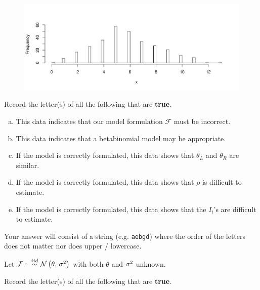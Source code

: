 \documentclass[12pt]{article}
\newcommand{\instr}{\scriptsize Your answer will consist of a string (e.g. \texttt{aebgd}) where the order of the letters does not matter nor does upper / lowercase. \normalsize}
\newcommand{\recordletters}{\small Record the letter(s) of all the following that are \textbf{true}. \normalsize}
\begin{document}
\begin{figure}[h]
\centering
\includegraphics[width=7in]{xs}
\end{figure}

\vspace{-1cm}
\benum{} \recordletters

\begin{enumerate}[(a)]
\item This data indicates that our model formulation $\mathcal{F}$ must be incorrect.
\item This data indicates that a betabinomial model may be appropriate.
\item If the model is correctly formulated, this data shows that $\theta_L$ and $\theta_R$ are similar.
\item If the model is correctly formulated, this data shows that $\rho$ is difficult to estimate.
\item If the model is correctly formulated, this data shows that the $I_i$'s are difficult to estimate.
\end{enumerate}\eenum\instr\pagebreak


\problem [17min] Let $\mathcal{F}: \iid \normnot{\theta}{\sigsq}$ with both $\theta$ and $\sigma^2$ unknown.


\benum{} \recordletters
\end{document}
